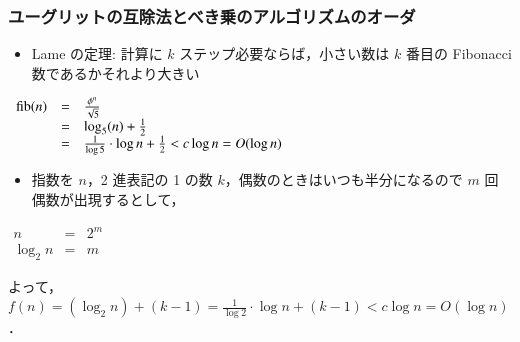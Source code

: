 \begin{frame}[shrink]
\frametitle{ユーグリットの互除法とべき乗のアルゴリズムのオーダ}
  \begin{example}[ユーグリットの互除法]
    \begin{itemize}
\item Lame の定理: 計算に $k$ ステップ必要ならば，小さい数は $k$ 番目の Fibonacci 数であるかそれより大きい
    \end{itemize}
    \begin{center}  
      \begin{math}
        \begin{array}{rcl}
\mathop{\mathrm{fib}}\nolimits(n)&=&\frac{\phi^{n}}{\sqrt{5}}\\
&=&\log_{5}(n)+\frac{1}{2}\\
&=&\frac{1}{\log 5}\cdot\log n+\frac{1}{2}<c\log n=O(\log n)
        \end{array}
      \end{math}
    \end{center}
  \end{example}
  \begin{example}[べき乗]
    \begin{itemize}
\item 指数を $n$，2 進表記の 1 の数 $k$，偶数のときはいつも半分になるので $m$ 回偶数が出現するとして，
    \end{itemize}
    \begin{center}
      \begin{math}
        \begin{array}{rcl}
n&=&2^m\\
\log_2 n &=& m
        \end{array}
      \end{math}
    \end{center}
よって， \(f(n)=(\log_2 n)+(k-1)=\frac{1}{\log 2}\cdot\log n+(k-1)<c\log n=O(\log n)\)．
  \end{example}
\end{frame}
